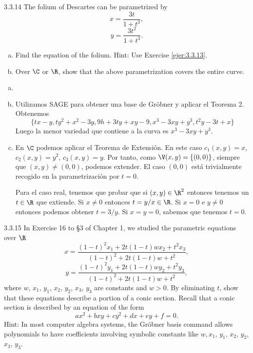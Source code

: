 \documentclass[twoside]{article}
\begin{document}
\begin{ejercicio}{3.3.14}
The folium of Descartes can be parametrized by
\[x =
\frac{3t}{1 + t^3} ,\]
\[y =
\frac{3t^2}{1 + t^3} .\]
\begin{enumerate}[a.]
\item Find the equation of the folium. Hint: Use Exercise \ref{ejer:3.3.13}.
\item Over $\C$ or $\R$, show that the above parametrization covers the entire curve.
\end{enumerate}
\end{ejercicio}
\begin{solucion}
\begin{enumerate}[a.]
\item[]
\item Utilizamos SAGE para obtener una base de Gröbner y aplicar el Teorema 2. Obtenemos
$$
\{tx - y, ty^2 + x^2 - 3y, 9h + 3ty + xy - 9, x^3 - 3xy + y^3, t^2y - 3t + x \}
$$
Luego la menor variedad que contiene a la curva es $x^3-3xy+y^3$. 
\item En $\C$ podemos aplicar el Teorema de Extensión. En este caso $c_1(x,y)=x$, $c_2(x,y)=y^2$, $c_3(x,y)=y$. Por tanto, como $\V(x,y)=\{(0,0)\}$, siempre que $(x,y)\neq (0,0)$, podemos extender. El caso $(0,0)$ está trivialmente recogido en la parametrización por $t=0$.

Para el caso real, tenemos que probar que si $(x,y)\in \R^2$ entonces tenemos un $t\in \R$ que extiende. Si $x\neq 0$ entonces $t=y/x \in \R$. Si $x=0$ e $y\neq 0$ entonces podemos obtener $t=3/y$. Si $x=y=0$, sabemos que tenemos $t=0$.
\end{enumerate}
\end{solucion}


\newpage

\begin{ejercicio}{3.3.15}
In Exercise 16 to §3 of Chapter 1, we studied the parametric equations over $\R$
\[x =
\frac{(1 − t)^2x_1 + 2t(1 − t)wx_2 + t^2x_3}{
(1 − t)^2 + 2t(1 − t)w + t^2 } ,\]
\[y =
\frac{(1 − t)^2y_1 + 2t(1 − t)wy_2 + t^2y_3}{
(1 − t)^2 + 2t(1 − t)w + t^2} ,\]
where $w$, $x_1$, $y_1$, $x_2$, $y_2$, $x_3$, $y_3$ are constants and $w > 0$. By eliminating $t$, show that these
equations describe a portion of a conic section. Recall that a conic section is described
by an equation of the form
\[ax^2 + bxy + cy^2 + dx + ey + f = 0.\]
Hint: In most computer algebra systems, the Gröbner basis command allows polynomials
to have coefficients involving symbolic constants like $w, x_1$, $y_1$, $x_2$, $y_2$, $x_3$, $y_3$.
\end{ejercicio}
\begin{solucion}
\end{solucion}
\end{document}
